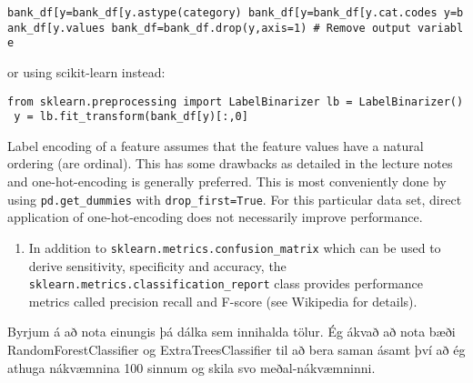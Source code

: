 \documentclass[11pt]{article}
\providecommand{\tightlist}{%
      \setlength{\itemsep}{0pt}\setlength{\parskip}{0pt}}
\begin{document}
\texttt{bank\_df{[}\textquotesingle{}y\textquotesingle{}{]}=bank\_df{[}\textquotesingle{}y\textquotesingle{}{]}.astype(\textquotesingle{}category\textquotesingle{})\ bank\_df{[}\textquotesingle{}y\textquotesingle{}{]}=bank\_df{[}\textquotesingle{}y\textquotesingle{}{]}.cat.codes\ y=bank\_df{[}\textquotesingle{}y\textquotesingle{}{]}.values\ bank\_df=bank\_df.drop(\textquotesingle{}y\textquotesingle{},axis=1)\ \#\ Remove\ output\ variable}

or using scikit-learn instead:

\texttt{from\ sklearn.preprocessing\ import\ LabelBinarizer\ lb\ =\ LabelBinarizer()\ y\ =\ lb.fit\_transform(bank\_df{[}\textquotesingle{}y\textquotesingle{}{]}){[}:,0{]}}

Label encoding of a feature assumes that the feature values have a
natural ordering (are ordinal). This has some drawbacks as detailed in
the lecture notes and one-hot-encoding is generally preferred. This is
most conveniently done by using \texttt{pd.get\_dummies} with
\texttt{drop\_first=True}. For this particular data set, direct
application of one-hot-encoding does not necessarily improve
performance.

\begin{enumerate}
\def\labelenumi{\arabic{enumi})}
\setcounter{enumi}{3}
\tightlist
\item
  In addition to \texttt{sklearn.metrics.confusion\_matrix} which can be
  used to derive sensitivity, specificity and accuracy, the
  \texttt{sklearn.metrics.classification\_report} class provides
  performance metrics called precision recall and F-score (see Wikipedia
  for details).
\end{enumerate}

    Byrjum á að nota einungis þá dálka sem innihalda tölur. Ég ákvað að nota
bæði RandomForestClassifier og ExtraTreesClassifier til að bera saman
ásamt því að ég athuga nákvæmnina 100 sinnum og skila svo
meðal-nákvæmninni.
\end{document}
